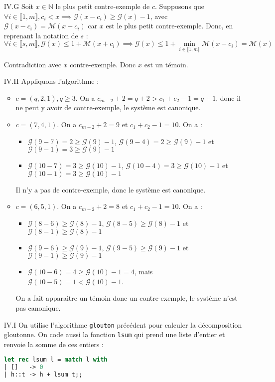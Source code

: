 \documentclass{article}
\newcommand{\N}{\mathbb{N}}
\newcommand{\M}{\mathscr{M}}
\newcommand{\G}{\mathscr{G}}
\newcommand{\seg}[2]{\llbracket #1, #2 \rrbracket}
\begin{document}
\begin{enumerate}
    \item[IV.G] Soit $x\in\N$ le plus petit contre-exemple de $c$. Supposons que $\forall i\in\seg{1}{m}, c_i < x \implies \G(x-c_i) \geq \G(x) - 1$, avec $\G(x-c_i) = \M(x-c_i)$ car $x$ est le plus petit contre-exemple. Donc, en reprenant la notation de $s$ :
        \[ \forall i\in\seg{s}{m}, \G(x) \leq 1 + \M(x + c_i)
            \implies \G(x) \leq 1 + \underset{i\in\seg{1}{m}}{\min} \M(x-c_i) = \M(x) \]

        Contradiction avec $x$ contre-exemple. Donc $x$ est un témoin.

    \item[IV.H] Appliquons l'algorithme :\begin{itemize}
            \item $c = (q,2,1), q \geq 3$. On a $c_{m-2} + 2 = q + 2 > c_1 + c_2 - 1 = q + 1$, donc il ne peut y avoir de contre-exemple, le système est canonique.
            \item $c = (7,4,1)$. On a $c_{m-2} + 2 = 9$ et $c_1 + c_2 - 1 = 10$. On a :\begin{itemize}
                    \item $\G(9-7) = 2 \geq \G(9) - 1$, $\G(9-4) = 2 \geq \G(9) - 1$ et $\G(9-1) = 3 \geq \G(9) - 1$
                    \item $\G(10-7) = 3 \geq \G(10) - 1$, $\G(10-4) = 3\geq \G(10) - 1$ et $\G(10-1) = 3 \geq \G(10) - 1$
                \end{itemize}
                Il n'y a pas de contre-exemple, donc le système est canonique.
            \item $c = (6, 5, 1)$. On a $c_{m-2} + 2 = 8$ et $c_1 + c_2 - 1 = 10$. On a :
                \begin{itemize}
                    \item $\G(8 - 6) \geq \G(8) - 1$, $\G(8 - 5) \geq \G(8) - 1$ et $\G(8 - 1) \geq \G(8) - 1$
                    \item $\G(9 - 6) \geq \G(9) - 1$, $\G(9 - 5) \geq \G(9) - 1$ et $\G(9 - 1) \geq \G(9) - 1$
                    \item $\G(10 - 6) = 4 \geq \G(10) - 1 = 4$, mais $\G(10 - 5) = 1 < \G(10) - 1$.
                \end{itemize}
                On a fait apparaitre un témoin donc un contre-exemple, le système n'est pas canonique.
        \end{itemize}

    \item[IV.I] On utilise l'algorithme \texttt{glouton} précédent pour calculer la décomposition gloutonne. On code aussi la fonction \texttt{lsum} qui prend une liste d'entier et renvoie la somme de ces entiers :
        \begin{lstlisting}[language=Caml]
let rec lsum l = match l with
| []   -> 0
| h::t -> h + lsum t;;
        \end{lstlisting}


\end{enumerate}
\end{document}
